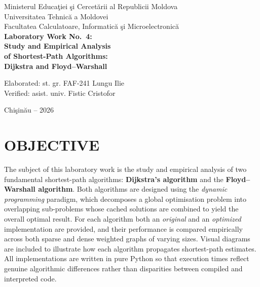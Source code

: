 \documentclass[12pt,a4paper]{article}
\begin{document}
	
	\begin{titlepage}
		\centering
		\vspace*{1cm}
		{\Large Ministerul Educa\c{t}iei \c{s}i Cercet\u{a}rii al Republicii Moldova\\}
		\vspace{0.5cm}
		{\Large Universitatea Tehnic\u{a} a Moldovei\\}
		\vspace{0.3cm}
		{\Large Facultatea Calculatoare, Informatic\u{a} \c{s}i Microelectronic\u{a}\\}
		\vspace{3cm}
		{\LARGE\bfseries Laboratory Work No.~4:\\}
		\vspace{0.5cm}
		{\LARGE\bfseries Study and Empirical Analysis\\}
		\vspace{0.3cm}
		{\LARGE\bfseries of Shortest-Path Algorithms:\\}
		\vspace{0.3cm}
		{\LARGE\bfseries Dijkstra and Floyd--Warshall\\}
		\vspace{4cm}
		\begin{flushleft}
			\hspace{6cm}Elaborated: st. gr. FAF-241 Lungu Ilie\\
			\vspace{1cm}
			\hspace{6cm}Verified: asist. univ. Fistic Cristofor\\
		\end{flushleft}
		\vfill
		{\large Chi\c{s}in\u{a}u -- 2026}
	\end{titlepage}
	
	\newpage
	\tableofcontents
	\newpage
	
	\section{OBJECTIVE}
	
	The subject of this laboratory work is the study and empirical analysis of two
	fundamental shortest-path algorithms: \textbf{Dijkstra's algorithm} and the
	\textbf{Floyd--Warshall algorithm}. Both algorithms are designed using the
	\emph{dynamic programming} paradigm, which decomposes a global optimisation
	problem into overlapping sub-problems whose cached solutions are combined to
	yield the overall optimal result. For each algorithm both an \emph{original} and
	an \emph{optimized} implementation are provided, and their performance is compared
	empirically across both sparse and dense weighted graphs of varying sizes. Visual
	diagrams are included to illustrate how each algorithm propagates shortest-path
	estimates. All implementations are written in pure Python so that execution times
	reflect genuine algorithmic differences rather than disparities between compiled
	and interpreted code.
	
\end{document}
